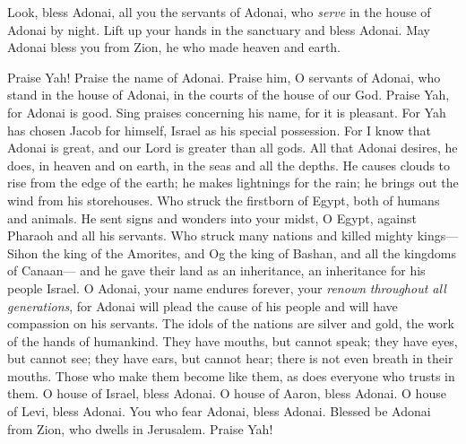 \begin{biblechapter} %
 Look, bless Adonai, all you the servants of Adonai, 
who \textit{serve} in the house of Adonai by night.
\verse Lift up your hands in the sanctuary 
and bless Adonai.
\verse May Adonai bless you from Zion, 
he who made heaven and earth.
\end{biblechapter}

\begin{biblechapter} %
 Praise Yah! Praise the name of Adonai. 
Praise him, O servants of Adonai,
\verse who stand in the house of Adonai, 
in the courts of the house of our God.
\verse Praise Yah, for Adonai is good. 
Sing praises concerning his name, for it is pleasant.
\verse For Yah has chosen Jacob for himself, 
Israel as his special possession.
\verse For I know that Adonai is great, 
and our Lord is greater than all gods.
\verse All that Adonai desires, he does, 
in heaven and on earth, 
in the seas and all the depths.
\verse He causes clouds to rise from the edge of the earth; 
he makes lightnings for the rain; 
he brings out the wind from his storehouses.
\verse Who struck the firstborn of Egypt, 
both of humans and animals.
\verse He sent signs and wonders into your midst, O Egypt, 
against Pharaoh and all his servants.
\verse Who struck many nations 
and killed mighty kings—
\verse Sihon the king of the Amorites, 
and Og the king of Bashan, 
and all the kingdoms of Canaan—
\verse and he gave their land as an inheritance, 
an inheritance for his people Israel.
\verse O Adonai, your name endures forever, 
your \textit{renown} \textit{throughout all generations},
\verse for Adonai will plead the cause of his people 
and will have compassion on his servants.
\verse The idols of the nations are silver and gold, 
the work of the hands of humankind.
\verse They have mouths, but cannot speak; 
they have eyes, but cannot see;
\verse they have ears, but cannot hear; 
there is not even breath in their mouths.
\verse Those who make them become like them, 
as does everyone who trusts in them.
\verse O house of Israel, bless Adonai. 
O house of Aaron, bless Adonai.
\verse O house of Levi, bless Adonai. 
You who fear Adonai, bless Adonai.
\verse Blessed be Adonai from Zion, 
who dwells in Jerusalem. Praise Yah!
\end{biblechapter}

